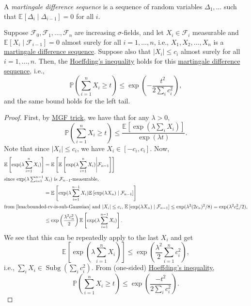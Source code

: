\begin{definition}\label{def:martingale-difference-sequence}
	A \emph{martingale difference sequence} is a sequence of random variables \(\Delta _1, \dots \) such that \(\mathbb{E}_{}\left[\Delta _i \mid \Delta _{i-1} \right] = 0\) for all \(i\).
\end{definition}

\begin{theorem}\label{thm:Azuma-Hoeffding-inequality}
	Suppose \(\mathcal{F} _0, \mathcal{F} _1, \dots , \mathcal{F} _n \) are increasing \(\sigma \)-fields, and let \(X_i \in \mathcal{F} _i\) measurable and \(\mathbb{E}_{}\left[X_i \mid \mathcal{F} _{i-1} \right] = 0\) almost surely for all \(i=1, \dots , n\), i.e., \(X_1, X_2, \dots , X_n\) is a \hyperref[def:martingale-difference-sequence]{martingale difference sequence}. Suppose also that \(\vert X_i \vert \leq c_i\) almost surely for all \(i = 1, \dots , n\). Then, the \hyperref[thm:Hoeffding-inequality]{Hoeffding's inequality} holds for this \hyperref[def:martingale-difference-sequence]{martingale difference sequence}, i.e.,
	\[
		\mathbb{P} \left( \sum_{i=1}^{n} X_i \geq t \right) \leq \exp(- \frac{t^2}{2 \sum_{i} c_i^2}),
	\]
	and the same bound holds for the left tail.
\end{theorem}
\begin{proof}
	First, by \hyperref[lma:MGF-trick]{MGF trick}, we have that for any \(\lambda >0\),
	\[
		\mathbb{P} \left( \sum_{i=1}^{n} X_i \geq t \right)
		\leq \frac{\mathbb{E}_{}\left[\exp (\lambda \sum_{i} X_i) \right] }{\exp (\lambda t)}.
	\]
	Note that since \(\vert X_i \vert \leq c_i\), we have \(X_i \in [- c_i, c_i]\). Now,
	\begin{align*}
		\mathbb{E}_{}\left[\exp (\lambda \sum_{i=1}^{n} X_i) \right]
		 & = \mathbb{E}_{}\left[\mathbb{E}_{}\left[\exp (\lambda \sum_{i=1}^n X_i ) \middle| \mathcal{F} _{n-1} \right]  \right]                  \\
		\shortintertext{since \(\exp (\lambda \sum_{i=1}^{n-1} X_i )\) is \(\mathcal{F} _{n-1}\)-measurable,}
		 & = \mathbb{E}_{}\left[\exp (\lambda \sum_{i=1}^{n-1} X_i) \mathbb{E}_{}\left[\exp (\lambda X_n) \mid \mathcal{F} _{n-1} \right] \right] \\
		\shortintertext{from \autoref{lma:bounded-rv-is-sub-Gaussian} and \(\vert X_i \vert \leq c_i\), \(\mathbb{E}_{}\left[\exp (\lambda X_n) \mid \mathcal{F} _{n-1} \right] \leq \exp (\lambda ^2 (2c_n)^2 / 8) = \exp (\lambda ^2 c_n^2 / 2)\),}
		 & \leq \exp \left( \frac{\lambda ^2 c_n^2}{2} \right) \mathbb{E}_{}\left[\exp (\lambda \sum_{i=1}^{n-1} X_i) \right].
	\end{align*}
	We see that this can be repeatedly apply to the last \(X_i\) and get
	\[
		\mathbb{E}_{}\left[\exp (\lambda \sum_{i=1}^{n} X_i) \right]
		\leq \exp \left( \frac{\lambda ^2}{2}\sum_{i=1}^{n} c_i^2 \right),
	\]
	i.e., \(\sum_{i} X_i\in \operatorname{Subg}(\sum_{i} c_i^2) \). From (one-sided) \hyperref[thm:Hoeffding-inequality]{Hoeffding's inequality},
	\[
		\mathbb{P} \left( \sum_{i=1}^{n} X_i \geq t \right)
		\leq \exp \left( \frac{-t^2}{2 \sum_{i} c_i^2} \right).
	\]
\end{proof}


